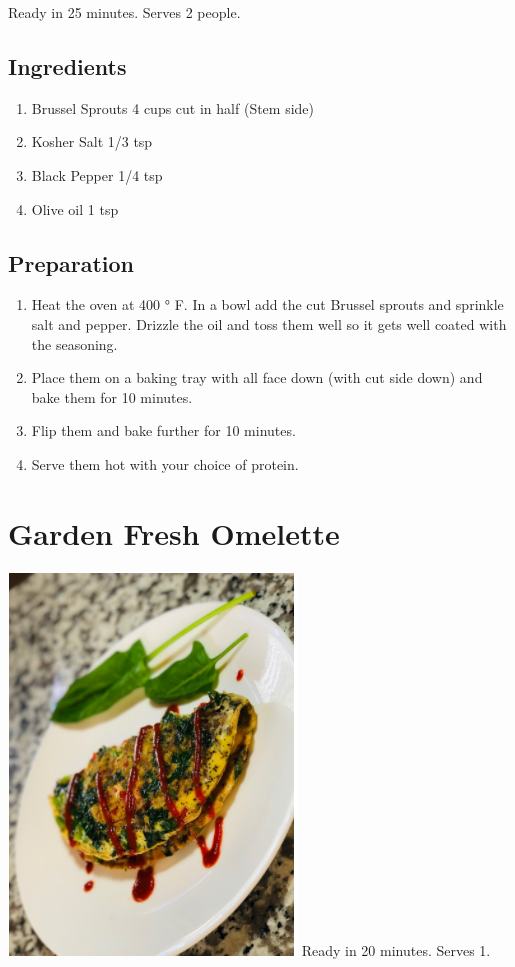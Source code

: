 \documentclass[
  oneside]{book}
\begin{document}
Ready in 25 minutes. Serves 2 people.

\hypertarget{ingredients-6}{%
\subsection{Ingredients}\label{ingredients-6}}

\begin{enumerate}
\def\labelenumi{\arabic{enumi}.}
\item
  Brussel Sprouts 4 cups cut in half (Stem side)
\item
  Kosher Salt 1/3 tsp
\item
  Black Pepper 1/4 tsp
\item
  Olive oil 1 tsp
\end{enumerate}

\hypertarget{preparation-6}{%
\subsection{Preparation}\label{preparation-6}}

\begin{enumerate}
\def\labelenumi{\arabic{enumi}.}
\item
  Heat the oven at 400 ° F. In a bowl add the cut Brussel sprouts and sprinkle salt and pepper. Drizzle the oil and toss them well so it gets well coated with the seasoning.
\item
  Place them on a baking tray with all face down (with cut side down) and bake them for 10 minutes.
\item
  Flip them and bake further for 10 minutes.
\item
  Serve them hot with your choice of protein.
\end{enumerate}

\hypertarget{garden-fresh-omelette}{%
\section{Garden Fresh Omelette}\label{garden-fresh-omelette}}

\includegraphics{pictures/garden-fresh-omlette.png}
Ready in 20 minutes. Serves 1.
\end{document}
